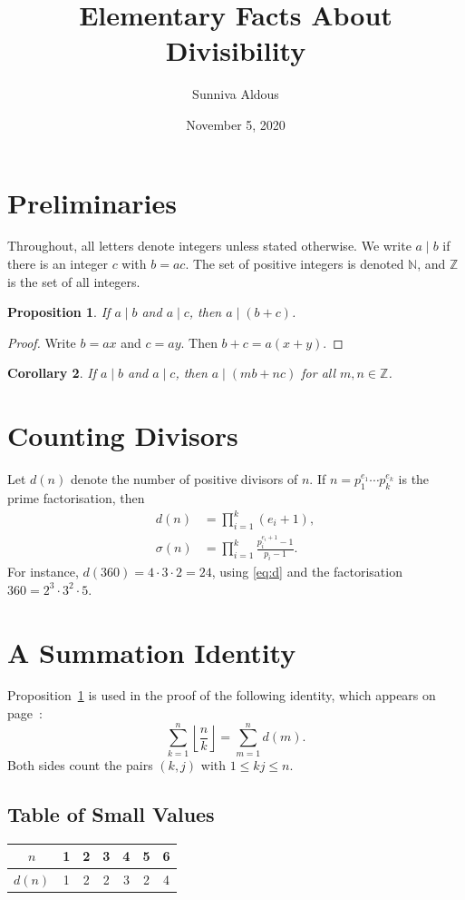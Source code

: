 \documentclass[11pt,letterpaper]{article}
\title{Elementary Facts About Divisibility}
\author{Sunniva Aldous}
\date{November 5, 2020}
\newtheorem{proposition}{Proposition}
\newtheorem{corollary}[proposition]{Corollary}
\begin{document}
\maketitle

\section{Preliminaries}
Throughout, all letters denote integers unless stated otherwise. We write
$a \mid b$ if there is an integer $c$ with $b = ac$. The set of positive
integers is denoted $\mathbb{N}$, and $\mathbb{Z}$ is the set of all integers.

\begin{proposition}\label{prop:sum}
If $a \mid b$ and $a \mid c$, then $a \mid (b + c)$.
\end{proposition}
\begin{proof}
Write $b = ax$ and $c = ay$. Then $b + c = a(x + y)$.
\end{proof}

\begin{corollary}\label{cor:lin}
If $a \mid b$ and $a \mid c$, then $a \mid (mb + nc)$ for all $m, n \in
\mathbb{Z}$.
\end{corollary}

\section{Counting Divisors}
Let $d(n)$ denote the number of positive divisors of $n$. If
$n = p_1^{e_1} \cdots p_k^{e_k}$ is the prime factorisation, then
\begin{align}
d(n) &= \prod_{i=1}^{k} (e_i + 1), \label{eq:d}\\
\sigma(n) &= \prod_{i=1}^{k} \frac{p_i^{e_i+1} - 1}{p_i - 1}. \label{eq:sigma}
\end{align}
For instance, $d(360) = 4 \cdot 3 \cdot 2 = 24$, using \eqref{eq:d} and the
factorisation $360 = 2^3 \cdot 3^2 \cdot 5$.

\section{A Summation Identity}
Proposition~\ref{prop:sum} is used in the proof of the following identity,
which appears on page~\pageref{eq:id}:
\begin{equation}\label{eq:id}
\sum_{k=1}^{n} \left\lfloor \frac{n}{k} \right\rfloor = \sum_{m=1}^{n} d(m).
\end{equation}
Both sides count the pairs $(k, j)$ with $1 \le k j \le n$.

\subsection{Table of Small Values}
\begin{center}
\begin{tabular}{c|cccccc}
$n$ & 1 & 2 & 3 & 4 & 5 & 6 \\ \hline
$d(n)$ & 1 & 2 & 2 & 3 & 2 & 4 \\
\end{tabular}
\end{center}
\end{document}
